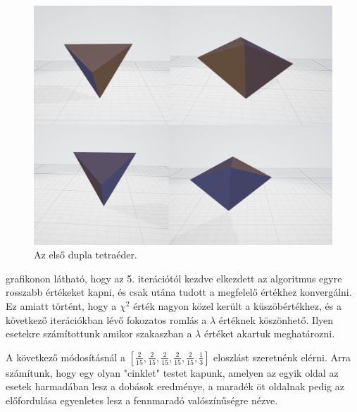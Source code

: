 \begin{figure}[h!]
	\centering
	\includegraphics[width=\textwidth]{images/double01obj.png}
	\caption{Az első dupla tetraéder.}
	\label{fig:double01obj}
\end{figure}

 grafikonon látható, hogy az 5. iterációtól kezdve elkezdett az algoritmus egyre rosszabb értékeket kapni, és csak utána tudott a megfelelő értékhez konvergálni.
Ez amiatt történt, hogy a $\chi^2$ érték nagyon közel került a küszöbértékhez, és a következő iterációkban lévő fokozatos romlás a $\lambda$ értéknek köszönhető.
Ilyen esetekre számítottunk amikor  szakaszban a $\lambda$ értéket akartuk meghatározni.

A következő módosításnál a $[\frac{2}{15}, \frac{2}{15}, \frac{2}{15}, \frac{2}{15}, \frac{2}{15}, \frac{1}{3}]$ eloszlást szeretnénk elérni.
Arra számítunk, hogy egy olyan "cinklet" testet kapunk, amelyen az egyik oldal az esetek harmadában lesz a dobások eredménye, a maradék öt oldalnak pedig az előfordulása egyenletes lesz a fennmaradó valószínűségre nézve.

